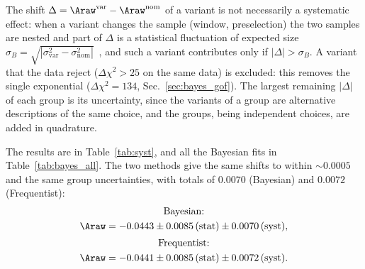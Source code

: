 The shift $\Delta=\Araw^{\mathrm{var}}-\Araw^{\mathrm{nom}}$ of a variant is not necessarily a systematic effect: when a variant changes the sample (window, preselection) the two samples are nested and part of $\Delta$ is a statistical fluctuation of expected size $\sigma_B=\sqrt{|\sigma_{\mathrm{var}}^2-\sigma_{\mathrm{nom}}^2|}$~\cite{barlow}, and such a variant contributes only if $|\Delta|>\sigma_B$. A variant that the data reject ($\Delta\chi^2>25$ on the same data) is excluded: this removes the single exponential ($\Delta\chi^2=134$, Sec.~\ref{sec:bayes_gof}). The largest remaining $|\Delta|$ of each group is its uncertainty, since the variants of a group are alternative descriptions of the same choice, and the groups, being independent choices, are added in quadrature.

The results are in Table~\ref{tab:syst}, and all the Bayesian fits in Table~\ref{tab:bayes_all}. The two methods give the same shifts to within $\sim$$0.0005$ and the same group uncertainties, with totals of $0.0070$ (Bayesian) and $0.0072$ (Frequentist):
\begin{gather*}
\text{Bayesian:}\\ \Araw=-0.0443\pm0.0085\,(\text{stat})\pm0.0070\,(\text{syst}),\\[2pt]
\text{Frequentist:}\\ \Araw=-0.0441\pm0.0085\,(\text{stat})\pm0.0072\,(\text{syst}).
\end{gather*}

